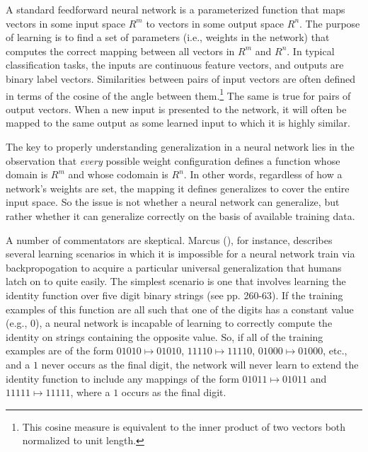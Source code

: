 A standard feedforward neural network is a parameterized function that maps vectors in some input space $R^m$ to vectors in some output space $R^n$. The purpose of learning is to find a set of parameters (i.e., weights in the network) that computes the correct mapping between all vectors in $R^m$ and $R^n$. In typical classification tasks, the inputs are continuous feature vectors, and outputs are binary label vectors. Similarities between pairs of input vectors are often defined in terms of the cosine of the angle between them.\footnote{This cosine measure is equivalent to the inner product of two vectors both normalized to unit length.} The same is true for pairs of output vectors. When a new input is presented to the network, it will often be mapped to the same output as some learned input to which it is highly similar. 

The key to properly understanding generalization in a neural network lies in the observation that \textit{every} possible weight configuration defines a function whose domain is $R^m$ and whose codomain is $R^n$. In other words, regardless of how a network's weights are set, the mapping it defines generalizes to cover the entire input space. So the issue is not whether a neural network can generalize, but rather whether it can generalize correctly on the basis of available training data. 

A number of commentators are skeptical. Marcus (\citeyear{Marcus:1998}), for instance, describes several learning scenarios in which it is impossible for a neural network train via backpropogation to acquire a particular universal generalization that humans latch on to quite easily. The simplest scenario is one that involves learning the identity function over five digit binary strings (see pp. 260-63). If the training examples of this function are all such that one of the digits has a constant value (e.g., $0$), a neural network is incapable of learning to correctly compute the identity on strings containing the opposite value. So, if all of the training examples are of the form $01010 \mapsto 01010$, $11110 \mapsto 11110$, $01000 \mapsto 01000$, etc., and a $1$ never occurs as the final digit, the network will never learn to extend the identity function to include any mappings of the form $01011 \mapsto 01011$ and $11111 \mapsto 11111$, where a $1$ occurs as the final digit. 

